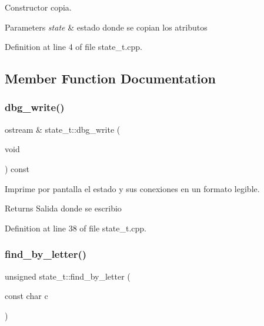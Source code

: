 Constructor copia. 


\begin{DoxyParams}{Parameters}
{\em state} & estado donde se copian los atributos \\
\hline
\end{DoxyParams}


Definition at line 4 of file state\+\_\+t.\+cpp.



\subsection{Member Function Documentation}
\mbox{\label{classstate__t_a4cbecc58710974534b8f1dc0592b9ae1}} 
\subsubsection{\texorpdfstring{dbg\+\_\+write()}{dbg\_write()}}
{\footnotesize\ttfamily ostream \& state\+\_\+t\+::dbg\+\_\+write (\begin{DoxyParamCaption}\item[{void}]{ }\end{DoxyParamCaption}) const}



Imprime por pantalla el estado y sus conexiones en un formato legible. 

\begin{DoxyReturn}{Returns}
Salida donde se escribio 
\end{DoxyReturn}


Definition at line 38 of file state\+\_\+t.\+cpp.

\mbox{\label{classstate__t_a716e1078c9486ebb9686dfc97d5749c7}} 
\subsubsection{\texorpdfstring{find\+\_\+by\+\_\+letter()}{find\_by\_letter()}}
{\footnotesize\ttfamily unsigned state\+\_\+t\+::find\+\_\+by\+\_\+letter (\begin{DoxyParamCaption}\item[{const char}]{c }\end{DoxyParamCaption})}



